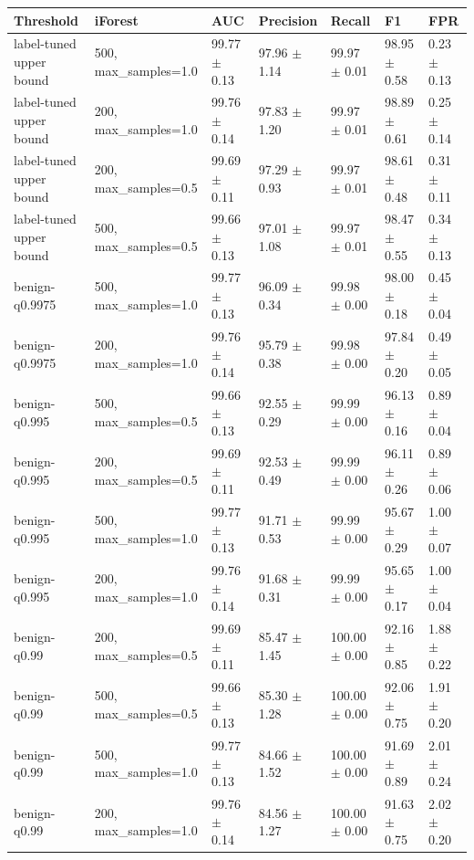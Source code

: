 \begin{tabular}{lllllll}
\toprule
Threshold & iForest & AUC & Precision & Recall & F1 & FPR \\
\midrule
label-tuned upper bound & 500, max_samples=1.0 & 99.77 $\pm$ 0.13 & 97.96 $\pm$ 1.14 & 99.97 $\pm$ 0.01 & 98.95 $\pm$ 0.58 & 0.23 $\pm$ 0.13 \\
label-tuned upper bound & 200, max_samples=1.0 & 99.76 $\pm$ 0.14 & 97.83 $\pm$ 1.20 & 99.97 $\pm$ 0.01 & 98.89 $\pm$ 0.61 & 0.25 $\pm$ 0.14 \\
label-tuned upper bound & 200, max_samples=0.5 & 99.69 $\pm$ 0.11 & 97.29 $\pm$ 0.93 & 99.97 $\pm$ 0.01 & 98.61 $\pm$ 0.48 & 0.31 $\pm$ 0.11 \\
label-tuned upper bound & 500, max_samples=0.5 & 99.66 $\pm$ 0.13 & 97.01 $\pm$ 1.08 & 99.97 $\pm$ 0.01 & 98.47 $\pm$ 0.55 & 0.34 $\pm$ 0.13 \\
benign-q0.9975 & 500, max_samples=1.0 & 99.77 $\pm$ 0.13 & 96.09 $\pm$ 0.34 & 99.98 $\pm$ 0.00 & 98.00 $\pm$ 0.18 & 0.45 $\pm$ 0.04 \\
benign-q0.9975 & 200, max_samples=1.0 & 99.76 $\pm$ 0.14 & 95.79 $\pm$ 0.38 & 99.98 $\pm$ 0.00 & 97.84 $\pm$ 0.20 & 0.49 $\pm$ 0.05 \\
benign-q0.995 & 500, max_samples=0.5 & 99.66 $\pm$ 0.13 & 92.55 $\pm$ 0.29 & 99.99 $\pm$ 0.00 & 96.13 $\pm$ 0.16 & 0.89 $\pm$ 0.04 \\
benign-q0.995 & 200, max_samples=0.5 & 99.69 $\pm$ 0.11 & 92.53 $\pm$ 0.49 & 99.99 $\pm$ 0.00 & 96.11 $\pm$ 0.26 & 0.89 $\pm$ 0.06 \\
benign-q0.995 & 500, max_samples=1.0 & 99.77 $\pm$ 0.13 & 91.71 $\pm$ 0.53 & 99.99 $\pm$ 0.00 & 95.67 $\pm$ 0.29 & 1.00 $\pm$ 0.07 \\
benign-q0.995 & 200, max_samples=1.0 & 99.76 $\pm$ 0.14 & 91.68 $\pm$ 0.31 & 99.99 $\pm$ 0.00 & 95.65 $\pm$ 0.17 & 1.00 $\pm$ 0.04 \\
benign-q0.99 & 200, max_samples=0.5 & 99.69 $\pm$ 0.11 & 85.47 $\pm$ 1.45 & 100.00 $\pm$ 0.00 & 92.16 $\pm$ 0.85 & 1.88 $\pm$ 0.22 \\
benign-q0.99 & 500, max_samples=0.5 & 99.66 $\pm$ 0.13 & 85.30 $\pm$ 1.28 & 100.00 $\pm$ 0.00 & 92.06 $\pm$ 0.75 & 1.91 $\pm$ 0.20 \\
benign-q0.99 & 500, max_samples=1.0 & 99.77 $\pm$ 0.13 & 84.66 $\pm$ 1.52 & 100.00 $\pm$ 0.00 & 91.69 $\pm$ 0.89 & 2.01 $\pm$ 0.24 \\
benign-q0.99 & 200, max_samples=1.0 & 99.76 $\pm$ 0.14 & 84.56 $\pm$ 1.27 & 100.00 $\pm$ 0.00 & 91.63 $\pm$ 0.75 & 2.02 $\pm$ 0.20 \\

\end{tabular}
